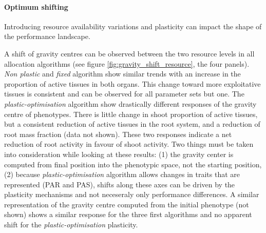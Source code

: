 
\paragraph{Optimum shifting}

Introducing resource availability variations and plasticity can impact the shape of the performance landscape.

A shift of gravity centres can be observed between the two resource levels in all allocation algorithms (see figure \ref{fig:gravity_shift_resource}, the four panels). \textit{Non plastic} and \textit{fixed} algorithm show similar trends with an increase in the proportion of active tissues in both organs. This change toward more exploitative tissues is consistent and can be observed for all parameter sets but one. The \textit{plastic-optimisation} algorithm show drastically different responses of the gravity centre of phenotypes. There is little change in shoot proportion of active tissues, but a consistent reduction of active tissues in the root system, and a reduction of root mass fraction (data not shown). These two responses indicate a net reduction of root activity in favour of shoot activity. Two things must be taken into consideration while looking at these results: (1) the gravity center is computed from final position into the phenotypic space, not the starting position, (2) because \textit{plastic-optimisation} algorithm allows changes in traits that are represented (PAR and PAS), shifts along these axes can be driven by the plasticity mechanisms and not neceseraly only performance differences. A similar representation of the gravity centre computed from the initial phenotype (not shown) shows a similar response for the three first algorithms and no apparent shift for the \textit{plastic-optimisation} plasticity.

